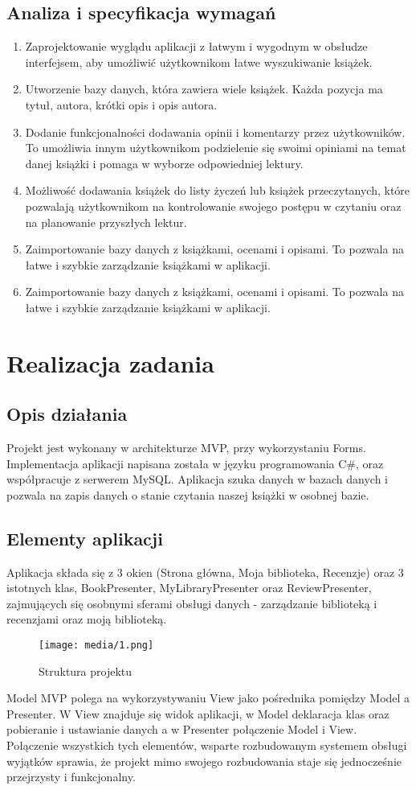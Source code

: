 \documentclass[12pt,a4paper]{article}
\begin{document}
\subsection{Analiza i specyfikacja wymagań}
\begin{enumerate}
    \item Zaprojektowanie wyglądu aplikacji z łatwym i wygodnym w obsłudze interfejsem, aby umożliwić użytkownikom łatwe wyszukiwanie książek.
    \item Utworzenie bazy danych, która zawiera wiele książek. Każda pozycja ma tytuł, autora, krótki opis i opis autora.
    \item Dodanie funkcjonalności dodawania opinii i komentarzy przez użytkowników. To umożliwia innym użytkownikom podzielenie się swoimi opiniami na temat danej książki i pomaga w wyborze odpowiedniej lektury.
    \item Możliwość dodawania książek do listy życzeń lub książek przeczytanych, które pozwalają użytkownikom na kontrolowanie swojego postępu w czytaniu oraz na planowanie przyszłych lektur.
    \item Zaimportowanie bazy danych z książkami, ocenami i opisami. To pozwala na łatwe i szybkie zarządzanie książkami w aplikacji.
    \item Zaimportowanie bazy danych z książkami, ocenami i opisami. To pozwala na łatwe i szybkie zarządzanie książkami w aplikacji.
\end{enumerate}
\newpage

\section{Realizacja zadania}
\subsection{Opis działania}
Projekt jest wykonany w architekturze MVP, przy wykorzystaniu Forms. Implementacja aplikacji napisana została w języku programowania C\#, oraz współpracuje z serwerem MySQL. Aplikacja szuka danych w bazach danych i pozwala na zapis danych o stanie czytania naszej książki w osobnej bazie.
\subsection{Elementy aplikacji}
Aplikacja składa się z 3 okien (Strona główna, Moja biblioteka, Recenzje) oraz 3 istotnych klas, BookPresenter, MyLibraryPresenter oraz ReviewPresenter, zajmujących się osobnymi sferami obsługi danych - zarządzanie biblioteką i recenzjami oraz moją biblioteką.\\
\begin{figure}[!h]
    \centering
    \texttt{[image: media/1.png]}
    \caption{Struktura projektu}
\end{figure}
\clearpage
Model MVP polega na wykorzystywaniu View jako pośrednika pomiędzy Model a Presenter. W View znajduje się widok aplikacji, w Model deklaracja klas oraz pobieranie i ustawianie danych a w Presenter połączenie Model i View.
Połączenie wszystkich tych elementów, wsparte rozbudowanym systemem obsługi wyjątków sprawia, że projekt mimo swojego rozbudowania staje się jednocześnie przejrzysty i funkcjonalny.
\end{document}
